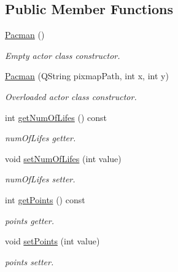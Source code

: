 \subsection*{Public Member Functions}
\begin{DoxyCompactItemize}
\item 
\mbox{\hyperlink{class_pacman_a499408baab38f119ebd4f41e90fbe3fe}{Pacman}} ()
\begin{DoxyCompactList}\small\item\em Empty actor class constructor. \end{DoxyCompactList}\item 
\mbox{\hyperlink{class_pacman_af7a106cbda2c19a855f87dcbac2bfcf5}{Pacman}} (Q\+String pixmap\+Path, int x, int y)
\begin{DoxyCompactList}\small\item\em Overloaded actor class constructor. \end{DoxyCompactList}\item 
\mbox{\label{class_pacman_a1a5ec305e9c5951128843ef1035aca2d}} 
int \mbox{\hyperlink{class_pacman_a1a5ec305e9c5951128843ef1035aca2d}{get\+Num\+Of\+Lifes}} () const
\begin{DoxyCompactList}\small\item\em num\+Of\+Lifes getter. \end{DoxyCompactList}\item 
\mbox{\label{class_pacman_a648f2e202abf2b944d1981865a957ed9}} 
void \mbox{\hyperlink{class_pacman_a648f2e202abf2b944d1981865a957ed9}{set\+Num\+Of\+Lifes}} (int value)
\begin{DoxyCompactList}\small\item\em num\+Of\+Lifes setter. \end{DoxyCompactList}\item 
\mbox{\label{class_pacman_aef66596227d1291f5b98141b707fa84c}} 
int \mbox{\hyperlink{class_pacman_aef66596227d1291f5b98141b707fa84c}{get\+Points}} () const
\begin{DoxyCompactList}\small\item\em points getter. \end{DoxyCompactList}\item 
\mbox{\label{class_pacman_a33eb0d7039987984eaf35ce623af9d83}} 
void \mbox{\hyperlink{class_pacman_a33eb0d7039987984eaf35ce623af9d83}{set\+Points}} (int value)
\begin{DoxyCompactList}\small\item\em points setter. \end{DoxyCompactList}\end{DoxyCompactItemize}
